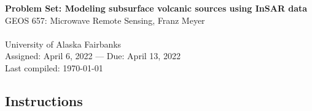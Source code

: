 \documentclass[11pt,titlepage,fleqn]{article}
\begin{document}

\begin{spacing}{1.2}
\centering
{\large \bf Problem Set: Modeling subsurface volcanic sources using InSAR data} \\
GEOS 657: Microwave Remote Sensing, Franz Meyer \\
\cltag\ \\
University of Alaska Fairbanks \\
Assigned: April 6, 2022 --- Due: April 13, 2022 \\
Last compiled: \today
\end{spacing}


\subsection*{Instructions}
\end{document}
